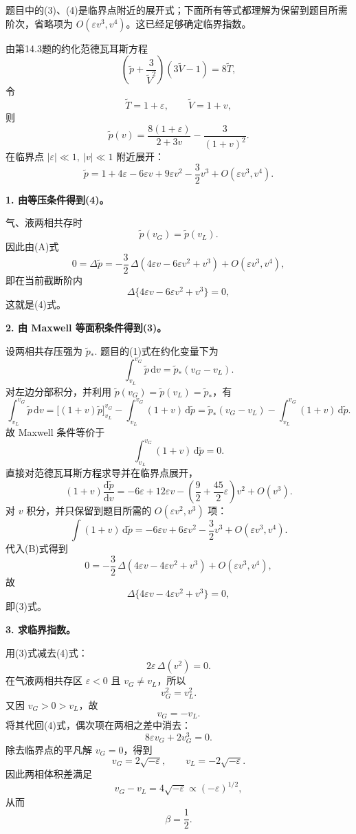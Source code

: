 \begin{solution}
题目中的(3)、(4)是临界点附近的展开式；下面所有等式都理解为保留到题目所需阶次，省略项为 $O(\varepsilon v^3,v^4)$。这已经足够确定临界指数。

由第14.3题的约化范德瓦耳斯方程
\[
\left(\tilde p+\frac{3}{\tilde V^2}\right)(3\tilde V-1)=8\tilde T,
\]
令
\[
\tilde T=1+\varepsilon,\qquad
\tilde V=1+v,
\]
则
\[
\tilde p(v)=\frac{8(1+\varepsilon)}{2+3v}-\frac{3}{(1+v)^2}.
\]
在临界点 $|\varepsilon|\ll1,\ |v|\ll1$ 附近展开：
\[
\tilde p
 =1+4\varepsilon-6\varepsilon v+9\varepsilon v^2
  -\frac32v^3+O(\varepsilon v^3,v^4).
\tag{A}
\]

\textbf{1. 由等压条件得到(4)。}

气、液两相共存时
\[
\tilde p(v_G)=\tilde p(v_L).
\]
因此由(A)式
\[
0=\Delta\tilde p
 =-\frac32\,
 \Delta\!\left(4\varepsilon v-6\varepsilon v^2+v^3\right)
 +O(\varepsilon v^3,v^4),
\]
即在当前截断阶内
\[
\boxed{\Delta\{4\varepsilon v-6\varepsilon v^2+v^3\}=0,}
\]
这就是(4)式。

\textbf{2. 由 Maxwell 等面积条件得到(3)。}

设两相共存压强为 $\tilde p_*$. 题目的(1)式在约化变量下为
\[
\int_{v_L}^{v_G}\tilde p\,\mathrm{d}v
 =\tilde p_*(v_G-v_L).
\]
对左边分部积分，并利用
$\tilde p(v_G)=\tilde p(v_L)=\tilde p_*$，有
\[
\int_{v_L}^{v_G}\tilde p\,\mathrm{d}v
 =\bigl[(1+v)\tilde p\bigr]_{v_L}^{v_G}
  -\int_{v_L}^{v_G}(1+v)\,\mathrm{d}\tilde p
 =\tilde p_*(v_G-v_L)
  -\int_{v_L}^{v_G}(1+v)\,\mathrm{d}\tilde p.
\]
故 Maxwell 条件等价于
\[
\int_{v_L}^{v_G}(1+v)\,\mathrm{d}\tilde p=0.
\tag{B}
\]
直接对范德瓦耳斯方程求导并在临界点展开，
\[
(1+v)\frac{\mathrm{d}\tilde p}{\mathrm{d}v}
 =-6\varepsilon+12\varepsilon v
  -\left(\frac92+\frac{45}{2}\varepsilon\right)v^2
  +O(v^3).
\]
对 $v$ 积分，并只保留到题目所需的
$O(\varepsilon v^2,v^3)$ 项：
\[
\int (1+v)\,\mathrm{d}\tilde p
 =-6\varepsilon v+6\varepsilon v^2-\frac{3}{2}v^3
 +O(\varepsilon v^3,v^4).
\]
代入(B)式得到
\[
0=-\frac32\,
\Delta\!\left(4\varepsilon v-4\varepsilon v^2+v^3\right)
+O(\varepsilon v^3,v^4),
\]
故
\[
\boxed{\Delta\{4\varepsilon v-4\varepsilon v^2+v^3\}=0,}
\]
即(3)式。

\textbf{3. 求临界指数。}

用(3)式减去(4)式：
\[
2\varepsilon\,\Delta(v^2)=0.
\]
在气液两相共存区 $\varepsilon<0$ 且 $v_G\ne v_L$，所以
\[
v_G^2=v_L^2.
\]
又因 $v_G>0>v_L$，故
\[
v_G=-v_L.
\]
将其代回(4)式，偶次项在两相之差中消去：
\[
8\varepsilon v_G+2v_G^3=0.
\]
除去临界点的平凡解 $v_G=0$，得到
\[
v_G=2\sqrt{-\varepsilon},\qquad
v_L=-2\sqrt{-\varepsilon}.
\]
因此两相体积差满足
\[
v_G-v_L=4\sqrt{-\varepsilon}
\propto(-\varepsilon)^{1/2},
\]
从而
\[
\boxed{\beta=\frac12}.
\]
\end{solution}


